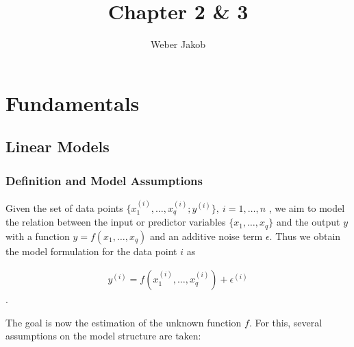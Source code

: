 \documentclass[10pt,a4paper]{report}
\title{Chapter 2 \& 3}
\author{Weber Jakob}
\begin{document}
\maketitle
\tableofcontents
\chapter{Fundamentals} \label{chap:fundamentals}

\section{Linear Models} \label{sec:LinModel}
	
\subsection{Definition and Model Assumptions}  \label{subsec:LinModelDefAndAssump}

Given the set of data points $\{x^{(i)}_1, \dots, x^{(i)}_q; y^{(i)} \}, \ i = 1, \dots, n$ , we aim to model the relation between the input or predictor variables $\{x_1, \dots, x_q\}$ and the output $y$ with a function $y = f(x_1, \dots, x_q)$ and an additive noise term $\epsilon$. Thus we obtain the model formulation for the data point $i$ as

\begin{align} \label{eq:lin_mod_single_data_point}
	y^{(i)} = f(x^{(i)}_{1}, \dots, x^{(i)}_{q}) + \epsilon^{(i)}
\end{align}.

The goal is now the estimation of the unknown function $f$. For this, several assumptions on the model structure are taken:
\end{document}
